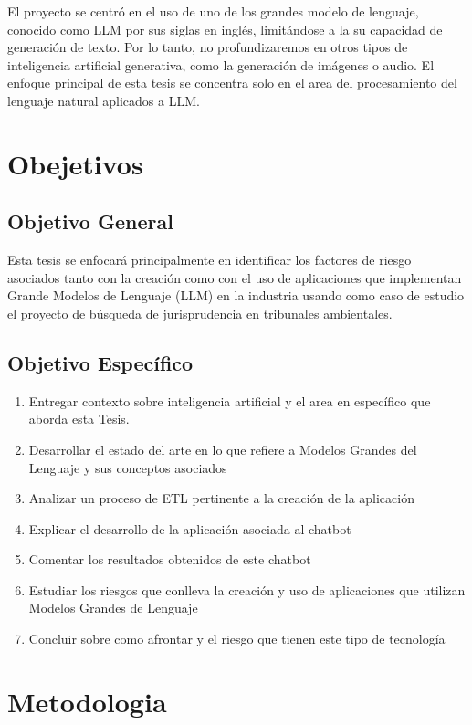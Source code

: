 El proyecto se centró en el uso de uno de los grandes modelo de lenguaje, conocido como LLM por sus siglas en inglés, limitándose a la su capacidad de 
generación de texto. Por lo tanto, no profundizaremos en otros tipos de inteligencia artificial generativa, como la 
generación de imágenes o audio. El enfoque principal de esta tesis se concentra solo en el area del procesamiento del lenguaje natural aplicados a LLM.

\newpage

\section{Obejetivos}
\subsection{Objetivo General}
Esta tesis se enfocará principalmente en identificar los factores de riesgo asociados tanto con la creación como con el 
uso de aplicaciones que implementan Grande Modelos de Lenguaje (LLM) en la industria usando como caso de 
estudio el proyecto de búsqueda de jurisprudencia en tribunales ambientales.

\subsection{Objetivo Específico}

\begin{enumerate}
    \item Entregar contexto sobre inteligencia artificial y el area en específico que aborda esta Tesis.
    \item Desarrollar el estado del arte en lo que refiere a Modelos Grandes del Lenguaje y sus conceptos asociados
    \item Analizar un proceso de ETL pertinente a la creación de la aplicación
    \item Explicar el desarrollo de la aplicación asociada al chatbot
    \item Comentar los resultados obtenidos de este chatbot
    \item Estudiar los riesgos que conlleva la creación y uso de aplicaciones que utilizan Modelos Grandes de Lenguaje
    \item Concluir sobre como afrontar y el riesgo que tienen este tipo de tecnología
\end{enumerate}


\section{Metodologia}

